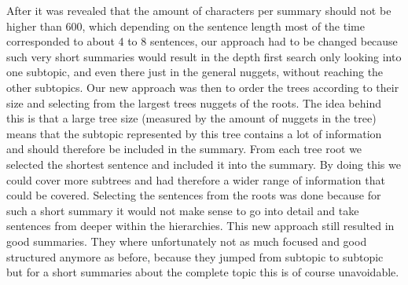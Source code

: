 After it was revealed that the amount of characters per summary should not be
higher than 600, which depending on the sentence length most of the time
corresponded to about 4 to 8 sentences, our approach had to be changed because such very short summaries would result in the depth first search only looking into one subtopic, and even
there just in the general nuggets, without reaching the other subtopics. Our new
approach was then to order the trees according to their size and selecting from
the largest trees nuggets of the roots. The idea behind this is that a large tree
size (measured by the amount of nuggets in the tree) means that the subtopic represented by
this tree contains a lot of information and should therefore be included in the
summary. From each tree root we selected the shortest sentence and included it
into the summary. By doing this we could cover more subtrees and had therefore a
wider range of information that could be covered. Selecting the sentences from
the roots was done because for such a short summary it would not make sense to
go into detail and take sentences from deeper within the hierarchies. This new
approach still resulted in good summaries. They where unfortunately not as much focused and
good structured anymore as before, because they jumped from subtopic to subtopic but for a short summaries about the complete topic this is of course unavoidable.

